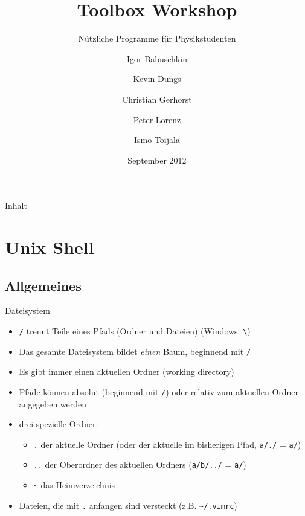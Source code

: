 \documentclass[t]{beamer}
\title{Toolbox Workshop}
\subtitle{Nützliche Programme für Physikstudenten}
\author[Igor B.\and Kevin D.\and Christian G.\and Peter L.\and Ismo T.]{
  Igor Babuschkin%
  \and Kevin Dungs%
  \and Christian Gerhorst%
  \and Peter Lorenz%
  \and Ismo Toijala%
}
\institute[PeP et al. e.V.]{PeP et al. e.V.\thanks{\href{http://pep-dortmund.org}{pep-dortmund.org}}}
\date{September 2012}
\begin{document}
  {
    \begin{frame}
      \titlepage
    \end{frame}
  }

  \begin{frame}{Inhalt}
    \tableofcontents
  \end{frame}

  \section{Unix Shell}
    \subsection{Allgemeines}
      \begin{frame}{Dateisystem}
        \begin{itemize}
          \item \texttt{/} trennt Teile eines Pfads (Ordner und Dateien) (Windows: \texttt{\textbackslash})
          \item Das gesamte Dateisystem bildet \emph{einen} Baum, beginnend mit \texttt{/}
          \item Es gibt immer einen aktuellen Ordner (working directory)
          \item Pfade können absolut (beginnend mit \texttt{/}) oder relativ zum aktuellen Ordner angegeben werden
          \item drei spezielle Ordner:
            \begin{itemize}
              \item \texttt{.} der aktuelle Ordner (oder der aktuelle im bisherigen Pfad, \texttt{a/./} = \texttt{a/})
              \item \texttt{..} der Oberordner des aktuellen Ordners (\texttt{a/b/../} = \texttt{a/})
              \item \texttt{\textasciitilde} das Heimverzeichnis
            \end{itemize}
          \item Dateien, die mit \texttt{.} anfangen sind versteckt (z.B. \texttt{\textasciitilde/.vimrc})
        \end{itemize}
      \end{frame}
\end{document}
